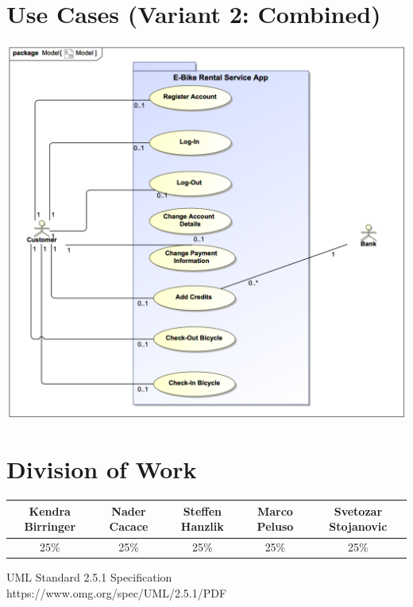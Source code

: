 \documentclass[a4paper, 12pt]{article}
\begin{document}
\section{Use Cases (Variant 2: Combined)}
\begin{center}
\includegraphics[scale=0.5]{02-e-bike-rental-service-variant-2.png}
\end{center}

\newpage
\section{Division of Work}
\renewcommand{\arraystretch}{1.5}
\begin{tabular}{|c|c|c|c|c|}
\hline
Kendra Birringer    & Nader Cacace  & Steffen Hanzlik   & Marco Peluso  & Svetozar Stojanovic\\
\hline
25\%                & 25\%          & 25\%              & 25\%          & 25\%\\
\hline
\end{tabular}
\newpage

\begin{thebibliography}{2}

UML Standard 2.5.1 Specification\\
https://www.omg.org/spec/UML/2.5.1/PDF

\end{thebibliography}
\end{document}
